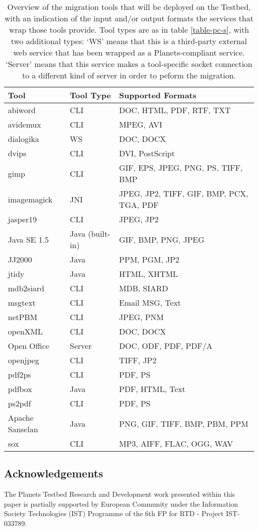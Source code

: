 \documentclass{article}
\begin{document}
\begin{table}
\centering
\begin{tabular}{|l|l|l|}
  \hline
  Tool  & Tool Type & Supported Formats \\
  \hline
  abiword & CLI & DOC, HTML, PDF, RTF, TXT \\
  avidemux & CLI & MPEG, AVI \\
  dialogika & WS & DOC, DOCX \\
  dvips & CLI & DVI, PostScript \\
  gimp & CLI & GIF, EPS, JPEG, PNG, PS, TIFF, BMP \\
  imagemagick & JNI & JPEG, JP2, TIFF, GIF, BMP, PCX, TGA, PDF  \\
  jasper19 & CLI & JPEG, JP2 \\
  Java SE 1.5 & Java (built-in) & GIF, BMP, PNG, JPEG  \\
  JJ2000 & Java & PPM, PGM, JP2  \\
  jtidy & Java &  HTML, XHTML \\
  mdb2siard & CLI & MDB, SIARD \\
  msgtext & CLI & Email MSG, Text \\
  netPBM & CLI & JPEG, PNM \\
  openXML & CLI & DOC, DOCX \\
  Open Office & Server  & DOC, ODF, PDF, PDF/A \\
  openjpeg & CLI & TIFF, JP2 \\
  pdf2ps & CLI & PDF, PS \\
  pdfbox & Java  & PDF, HTML, Text \\
  ps2pdf & CLI & PDF, PS \\
  Apache Sanselan & Java  & PNG, GIF, TIFF, BMP, PBM, PPM \\
  sox & CLI  & MP3, AIFF, FLAC, OGG, WAV\\
  \hline
\end{tabular}
\caption{Overview of the migration tools that will be deployed on the Testbed, with an indication of the input and/or output formats the services that wrap those tools provide.  Tool types are as in table \ref{table-pc-s}, with two additional types: `WS' means that this is a third-party external web service that has been wrapped as a Planets-compliant service. `Server' means that this service makes a tool-specific socket connection to a different kind of server in order to peform the migration.}
\label{table-pa-s}
\end{table}

\subsection*{Acknowledgements}
The Planets Testbed Research and Development work presented within this paper is partially supported by European Community under the Information Society Technologies (IST) Programme of the 6th FP for RTD - Project IST-033789.




\end{document}
